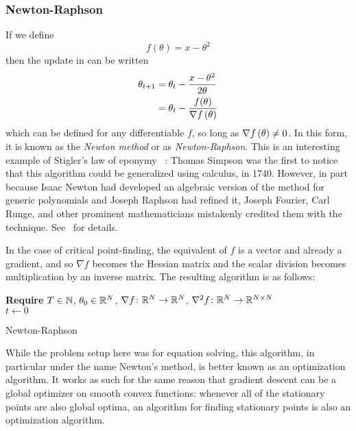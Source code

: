 \documentclass[../../thesis.tex]{subfiles}
\begin{document}
\subsubsection{Newton-Raphson}

If we define
\begin{equation}
	f(\theta) = x - \theta^2
\end{equation}
\noindent then the update in 
can be written
\begin{align}
	\theta_{t+1} &= \theta_t - \frac{x - \theta^2}{2\theta}\\
	&= \theta_t - \frac{f(\theta)}{\nabla f\left(\theta\right)}
\end{align}
\noindent which can be defined for any differentiable $f$,
so long as $\nabla f\left(\theta\right)\neq 0$.
In this form, it is known as the \emph{Newton method}
or as \emph{Newton-Raphson}.
This is an interesting example of Stigler's law of eponymy%
~\cite{stigler1980}:
Thomas Simpson was the first to notice that
this algorithm could be generalized using calculus,
in 1740.
However, in part because Isaac Newton had developed an
algebraic version of the method
for generic polynomials and Joseph Raphson had refined it,
Joseph Fourier, Carl Runge, and other
prominent mathematicians mistakenly credited them with the technique.
See~\cite{kollerstrom1992} for details.

In the case of critical point-finding,
the equivalent of $f$ is a vector and already a gradient,
and so $\nabla f$ becomes the Hessian matrix
and the scalar division becomes multiplication by an inverse matrix.
The resulting algorithm is as follows:

\begin{algorithm}[H]
    \SetAlgoLined{}
    \textbf{Require}
    $T\in \mathbb{N}$, $\theta_0 \in \mathbb{R}^N$,
    $\nabla{f}\colon\mathbb{R}^N\to\mathbb{R}^N$,
    $\nabla^2{f}\colon\mathbb{R}^N\to\mathbb{R}^{N\times N}$\\
    $t \leftarrow 0$\\
    \caption{Newton-Raphson}
\end{algorithm}

While the problem setup here was for equation solving,
this algorithm, in particular under the name Newton's method,
is better known as an optimization algorithm.
It works as such for the same reason that gradient descent
can be a global optimizer on smooth convex functions:
whenever all of the stationary points
are also global optima,
an algorithm for finding stationary points is also
an optimization algorithm.
\end{document}
